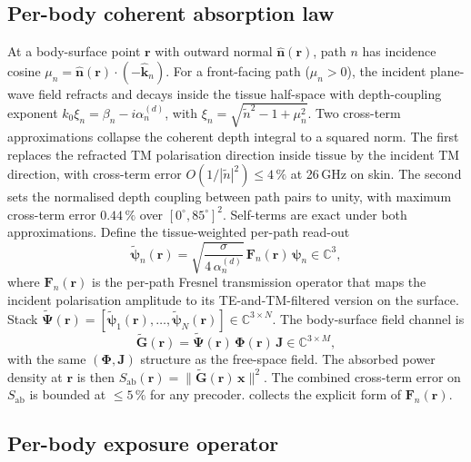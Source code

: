 \documentclass[journal,twocolumn,10pt]{IEEEtran}
\theoremstyle{plain}
\theoremstyle{remark}
\newcommand{\khat}{\hat{\bm{k}}}
\newcommand{\nhat}{\hat{\bm{n}}}
\newcommand{\rr}{\mathbf{r}}
\newcommand{\xx}{\mathbf{x}}
\newcommand{\Sab}{S_{\mathrm{ab}}}
\newcommand{\Gtil}{\tilde{\mathbf{G}}}
\newcommand{\Jmat}{\mathbf{J}}
\newcommand{\Phimat}{\mathbf{\Phi}}
\newcommand{\Psitil}{\tilde{\bm{\Psi}}}
\newcommand{\Fn}{\mathbf{F}_n}
\newcommand{\psin}{\bm{\psi}_n}
\newcommand{\Complex}{\mathbb{C}}
\newcommand{\ntilde}{\tilde{n}}
\begin{document}
\subsection{Per-body coherent absorption law}\label{sec:cohlaw}

At a body-surface point $\rr$ with outward normal $\nhat(\rr)$, path
$n$ has incidence cosine $\mu_n = \nhat(\rr)\cdot(-\khat_n)$. For a
front-facing path ($\mu_n > 0$), the incident plane-wave field
refracts and decays inside the tissue half-space with depth-coupling
exponent $k_0 \xi_n = \beta_n - i \alpha_n^{(d)}$, with
$\xi_n = \sqrt{\ntilde^2 - 1 + \mu_n^2}$. Two cross-term
approximations collapse the coherent depth integral to a squared
norm. The first replaces the refracted TM polarisation direction
inside tissue by the incident TM direction, with cross-term error
$O(1/|\ntilde|^2) \leq 4\,\%$ at 26\,GHz on skin. The second sets the
normalised depth coupling between path pairs to unity, with maximum
cross-term error $0.44\,\%$ over $[0^\circ, 85^\circ]^2$. Self-terms
are exact under both approximations. Define the tissue-weighted
per-path read-out
\begin{equation}\label{eq:psitil}
  \tilde{\bm\psi}_n(\rr) = \sqrt{\frac{\sigma}{4\,\alpha_n^{(d)}}}\,
  \Fn(\rr)\,\psin \in \Complex^3,
\end{equation}
where $\Fn(\rr)$ is the per-path Fresnel transmission operator that
maps the incident polarisation amplitude to its TE-and-TM-filtered
version on the surface. Stack
$\Psitil(\rr) = [\tilde{\bm\psi}_1(\rr), \ldots,
\tilde{\bm\psi}_N(\rr)] \in \Complex^{3 \times N}$. The body-surface
field channel is
\begin{equation}\label{eq:Gtilde}
  \Gtil(\rr) = \Psitil(\rr)\,\Phimat(\rr)\,\Jmat
  \in \Complex^{3 \times M},
\end{equation}
with the same $(\Phimat, \Jmat)$ structure as the free-space field.
The absorbed power density at $\rr$ is then
$\Sab(\rr) = \|\Gtil(\rr)\,\xx\|^2$. The combined cross-term error on
$\Sab$ is bounded at $\leq 5\,\%$ for any precoder. 
collects the explicit form of $\Fn(\rr)$.

\subsection{Per-body exposure operator}\label{sec:Q}
\end{document}
